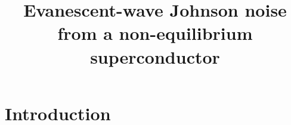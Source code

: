 \documentclass{article}
\title{Evanescent-wave Johnson noise from a non-equilibrium superconductor}
\begin{document}
\maketitle

\section{Introduction \label{sec:intro}}


\printbibliography
\end{document}
